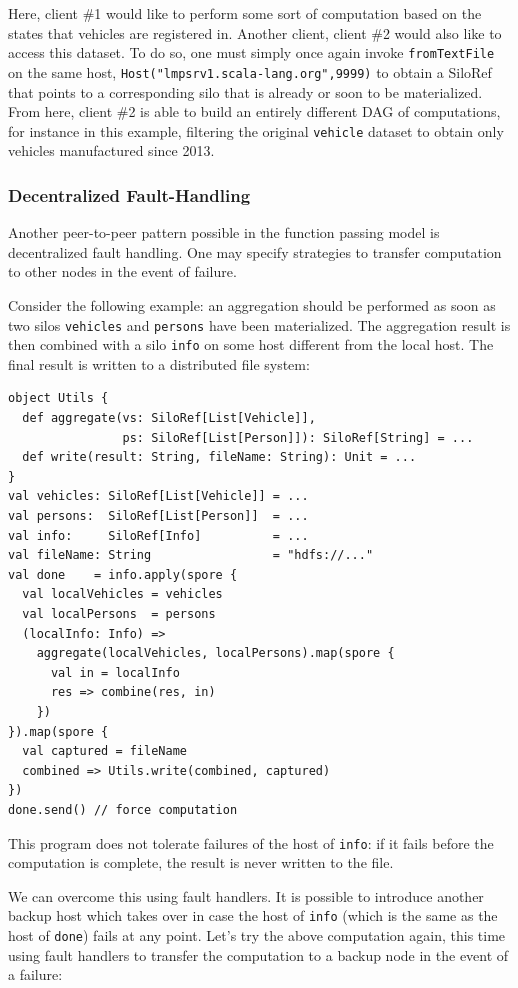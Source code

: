 \documentclass{jfp1}
\begin{document}
{Here, client \#1 would like to perform some sort of computation based on the
states that vehicles are registered in. Another client, client \#2 would also
like to access this dataset. To do so, one must simply once again invoke
\verb|fromTextFile| on the same host, \verb|Host("lmpsrv1.scala-lang.org",9999)|
to obtain a SiloRef that points to a corresponding silo that is already or soon
to be materialized. From here, client \#2 is able to build an entirely different
DAG of computations, for instance in this example, filtering the original
\verb|vehicle| dataset to obtain only vehicles manufactured since 2013.

\subsubsection{Decentralized Fault-Handling}

Another peer-to-peer pattern possible in the function passing model is
decentralized fault handling. One may specify strategies to transfer computation
to other nodes in the event of failure.

Consider the following example: an aggregation should be performed as soon as
two silos \verb|vehicles| and \verb|persons| have been materialized. The
aggregation result is then combined with a silo \verb|info| on some host
different from the local host. The final result is written to a distributed file
system:

\vspace{-0.8mm}
\begin{lstlisting}
object Utils {
  def aggregate(vs: SiloRef[List[Vehicle]],
                ps: SiloRef[List[Person]]): SiloRef[String] = ...
  def write(result: String, fileName: String): Unit = ...
}
val vehicles: SiloRef[List[Vehicle]] = ...
val persons:  SiloRef[List[Person]]  = ...
val info:     SiloRef[Info]          = ...
val fileName: String                 = "hdfs://..."
val done    = info.apply(spore {
  val localVehicles = vehicles
  val localPersons  = persons
  (localInfo: Info) =>
    aggregate(localVehicles, localPersons).map(spore {
      val in = localInfo
      res => combine(res, in)
    })
}).map(spore {
  val captured = fileName
  combined => Utils.write(combined, captured)
})
done.send() // force computation
\end{lstlisting}
\noindent
This program does not tolerate failures of the host of \verb|info|: if it fails
before the computation is complete, the result is never written to the file.

We can overcome this using fault handlers. It is possible to introduce another
backup host which takes over in case the host of \verb|info| (which is the same
as the host of \verb|done|) fails at any point. Let's try the above computation
again, this time using fault handlers to transfer the computation to a backup
node in the event of a failure:

}
\end{document}
